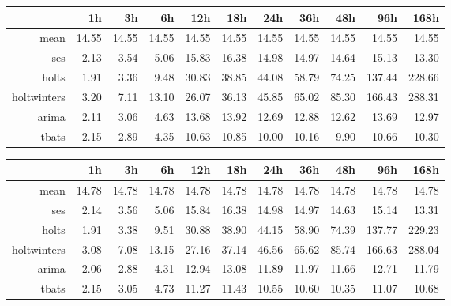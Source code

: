 \begin{table}[ht]
\centering
\begin{tabular}{rrrrrrrrrrr}
  \hline
 & 1h & 3h & 6h & 12h & 18h & 24h & 36h & 48h & 96h & 168h \\ 
  \hline
mean & 14.55 & 14.55 & 14.55 & 14.55 & 14.55 & 14.55 & 14.55 & 14.55 & 14.55 & 14.55 \\ 
  ses & 2.13 & 3.54 & 5.06 & 15.83 & 16.38 & 14.98 & 14.97 & 14.64 & 15.13 & 13.30 \\ 
  holts & 1.91 & 3.36 & 9.48 & 30.83 & 38.85 & 44.08 & 58.79 & 74.25 & 137.44 & 228.66 \\ 
  holtwinters & 3.20 & 7.11 & 13.10 & 26.07 & 36.13 & 45.85 & 65.02 & 85.30 & 166.43 & 288.31 \\ 
  arima & 2.11 & 3.06 & 4.63 & 13.68 & 13.92 & 12.69 & 12.88 & 12.62 & 13.69 & 12.97 \\ 
  tbats & 2.15 & 2.89 & 4.35 & 10.63 & 10.85 & 10.00 & 10.16 & 9.90 & 10.66 & 10.30 \\ 
   \hline
\end{tabular}
\end{table}
\begin{table}[ht]
\centering
\begin{tabular}{rrrrrrrrrrr}
  \hline
 & 1h & 3h & 6h & 12h & 18h & 24h & 36h & 48h & 96h & 168h \\ 
  \hline
mean & 14.78 & 14.78 & 14.78 & 14.78 & 14.78 & 14.78 & 14.78 & 14.78 & 14.78 & 14.78 \\ 
  ses & 2.14 & 3.56 & 5.06 & 15.84 & 16.38 & 14.98 & 14.97 & 14.63 & 15.14 & 13.31 \\ 
  holts & 1.91 & 3.38 & 9.51 & 30.88 & 38.90 & 44.15 & 58.90 & 74.39 & 137.77 & 229.23 \\ 
  holtwinters & 3.08 & 7.08 & 13.15 & 27.16 & 37.14 & 46.56 & 65.62 & 85.74 & 166.63 & 288.04 \\ 
  arima & 2.06 & 2.88 & 4.31 & 12.94 & 13.08 & 11.89 & 11.97 & 11.66 & 12.71 & 11.79 \\ 
  tbats & 2.15 & 3.05 & 4.73 & 11.27 & 11.43 & 10.55 & 10.60 & 10.35 & 11.07 & 10.68 \\ 
   \hline
\end{tabular}
\end{table}

